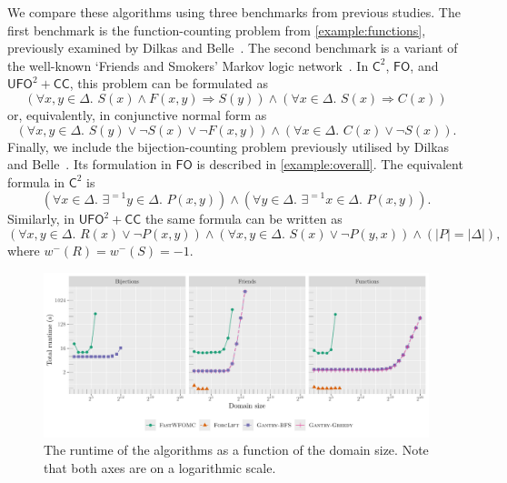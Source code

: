 \documentclass[a4paper,UKenglish,cleveref, autoref, thm-restate]{lipics-v2021}
\newcommand{\Ctwo}{$\mathsf{C}^{2}$}
\newcommand{\FO}{$\mathsf{FO}$}
\newcommand{\UFO}{$\mathsf{UFO}^{2} + \mathsf{CC}$}
\newcommand{\Cranetwo}{\textsc{Gantry}}
\begin{document}
We compare these algorithms using three benchmarks from previous studies. The
first benchmark is the function-counting problem from \cref{example:functions},
previously examined by Dilkas and Belle~\cite{DBLP:conf/kr/DilkasB23}. The
second benchmark is a variant of the well-known `Friends and Smokers' Markov
logic network~\cite{DBLP:conf/aaai/SinglaD08,DBLP:conf/uai/BroeckCD12}. In
\Ctwo{}, \FO{}, and \UFO{}, this problem can be formulated as
\[
  (\forall x,y \in \Delta\text{. } S(x) \land F(x, y) \Rightarrow S(y)) \land (\forall x \in \Delta\text{. }S(x) \Rightarrow C(x))
\]
or, equivalently, in conjunctive normal form as
\[
  (\forall x,y \in \Delta\text{. }S(y) \lor \neg S(x) \lor \neg F(x, y)) \land (\forall x \in \Delta\text{. } C(x) \lor \neg S(x)).
\]
Finally, we include the bijection-counting problem previously utilised by Dilkas
and Belle~\cite{DBLP:conf/kr/DilkasB23}. Its formulation in \FO{} is described
in \cref{example:overall}. The equivalent formula in \Ctwo{} is
\[
  (\forall x \in \Delta\text{. }\exists^{=1} y \in \Delta\text{. }P(x, y)) \land (\forall y \in \Delta\text{. }\exists^{=1} x \in \Delta\text{. }P(x, y)).
\]
Similarly, in \UFO{} the same formula can be written as
\[
  (\forall x, y \in \Delta\text{. }R(x) \lor \neg P(x, y)) \land (\forall x, y \in \Delta\text{. }S(x) \lor \neg P(y, x)) \land (|P| = |\Delta|),
\]
where $w^{-}(R) = w^{-}(S) = -1$.

\begin{figure}[t]
  \centering
  \includegraphics{plot.pdf}
  \caption{The runtime of the algorithms as a function of the domain size. Note
    that both axes are on a logarithmic scale.}\label{fig:plot}
\end{figure}

\end{document}
